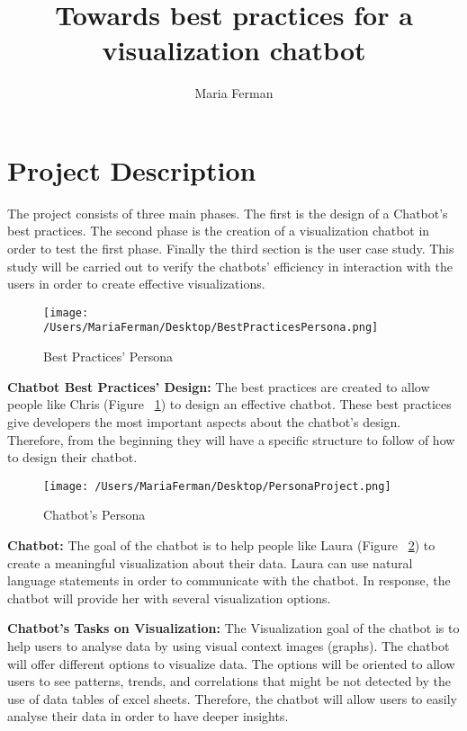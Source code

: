 \documentclass[a4paper,10pt]{article}
\title{Towards best practices for a visualization chatbot}
\author{Maria Ferman}
\begin{document}
\maketitle

\section*{Project Description}

The project consists of three main phases. The first is the design of a Chatbot's best practices. The second phase is the creation of a visualization chatbot in order to test the first phase. Finally the third section is the user case study. This study will be carried out to verify the chatbots' efficiency in interaction with the users in order to create effective visualizations.

\begin{figure}
\centering
\texttt{[image: /Users/MariaFerman/Desktop/BestPracticesPersona.png]}
\caption{Best Practices' Persona}
\label{FigureChris}
\end{figure}

\textbf{Chatbot Best Practices' Design:} The best practices are created to allow people like Chris (Figure ~\ref{FigureChris}) to design an effective chatbot. These best practices give developers the most important aspects about the chatbot's design. Therefore, from the beginning they will have a specific structure to follow of how to design  their chatbot.

\begin{figure}
\centering
\texttt{[image: /Users/MariaFerman/Desktop/PersonaProject.png]}
\caption{Chatbot's Persona}
\label{FigureLaura}
\end{figure}

\textbf{Chatbot:} The goal of the chatbot is to help people like Laura (Figure ~\ref{FigureLaura}) to create a meaningful visualization about their data. Laura can use natural language statements in order to communicate with the chatbot. In response, the chatbot will provide her with several visualization options.

\textbf{Chatbot's Tasks on Visualization:} The Visualization goal of the chatbot is to help users to analyse data by using visual context images (graphs). The chatbot will offer different options to visualize data. The options will be oriented to allow users to see patterns, trends, and correlations that might be not detected by the use of data tables of excel sheets. Therefore, the chatbot will allow users to easily analyse their data in order to have deeper insights.  

\medskip


\end{document}
